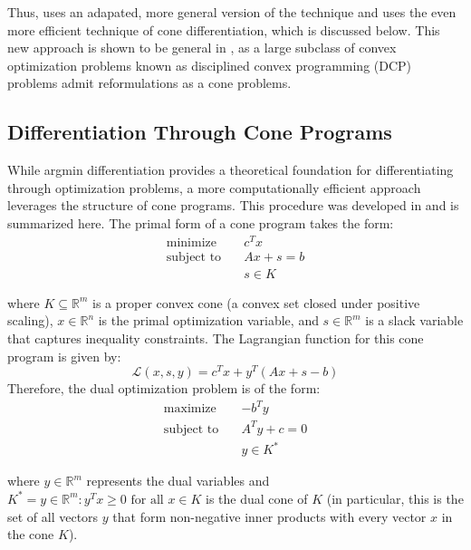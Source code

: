 \documentclass{article}
\begin{document}
Thus, \citet{optnet} uses an adapated, more general version of the technique and \citet{differentiableconvexoptimizationlayers} uses the even more efficient technique of cone differentiation, which is discussed below. This new approach is shown to be general in \citet{differentiableconvexoptimizationlayers}, as a large subclass of convex optimization problems known as disciplined convex programming (DCP) problems admit reformulations as a cone problems. 

\subsection{Differentiation Through Cone Programs}

While argmin differentiation provides a theoretical foundation for differentiating through optimization problems, a more computationally efficient approach leverages the structure of cone programs. This procedure was developed in \citet{conedifferentiation} and is summarized here. The primal form of a cone program takes the form:
\begin{equation}
\begin{aligned}
\text{minimize} \quad & c^T x \\
\text{subject to} \quad & Ax + s = b \\
                        & s \in K
\end{aligned}
\end{equation}

where $K \subseteq \mathbb{R}^m$ is a proper convex cone (a convex set closed under positive scaling), $x \in \mathbb{R}^n$ is the primal optimization variable, and $s \in \mathbb{R}^m$ is a slack variable that captures inequality constraints. The Lagrangian function for this cone program is given by:
\begin{equation}
\mathcal{L}(x,s,y) = c^T x + y^T(Ax + s - b)
\end{equation}
Therefore, the dual optimization problem is of the form:
\begin{equation}
\begin{aligned}
\text{maximize} \quad & -b^T y \\
\text{subject to} \quad & A^T y + c = 0 \\
                        & y \in K^*
\end{aligned}
\end{equation}

where $y \in \mathbb{R}^m$ represents the dual variables and $K^* = {y \in \mathbb{R}^m : y^T x \geq 0 \text{ for all } x \in K}$ is the dual cone of $K$ (in particular, this is the set of all vectors \( y \) that form non-negative inner products with every vector \( x \) in the cone \( K \)). 
\end{document}
